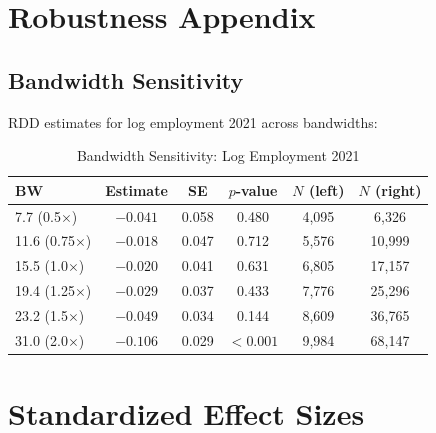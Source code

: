 \documentclass[12pt]{article}
\begin{document}
\section{Robustness Appendix}

\subsection{Bandwidth Sensitivity}

RDD estimates for log employment 2021 across bandwidths:

\begin{table}[H]
\centering
\caption{Bandwidth Sensitivity: Log Employment 2021}
\label{tab:bw}
\begin{tabular}{lccccc}
\toprule
BW & Estimate & SE & $p$-value & $N$ (left) & $N$ (right) \\
\midrule
7.7 (0.5$\times$) & $-0.041$ & 0.058 & 0.480 & 4,095 & 6,326 \\
11.6 (0.75$\times$) & $-0.018$ & 0.047 & 0.712 & 5,576 & 10,999 \\
15.5 (1.0$\times$) & $-0.020$ & 0.041 & 0.631 & 6,805 & 17,157 \\
19.4 (1.25$\times$) & $-0.029$ & 0.037 & 0.433 & 7,776 & 25,296 \\
23.2 (1.5$\times$) & $-0.049$ & 0.034 & 0.144 & 8,609 & 36,765 \\
31.0 (2.0$\times$) & $-0.106$ & 0.029 & $<0.001$ & 9,984 & 68,147 \\
\bottomrule
\end{tabular}
\end{table}

\section{Standardized Effect Sizes}
\label{sec:sde}


\end{document}
